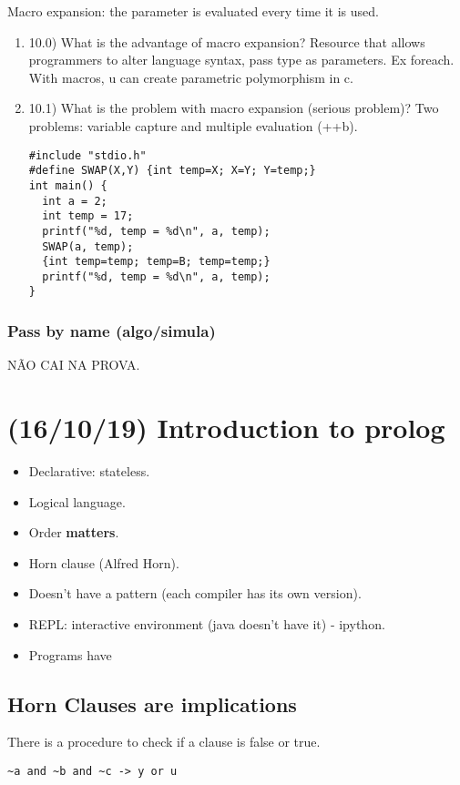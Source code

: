 \documentclass[11pt]{article}
\begin{document}
Macro expansion: the parameter is evaluated every time it is used.
\begin{enumerate}
\item 10.0) What is the advantage of macro expansion?
\label{sec:org4fd13bf}
Resource that allows programmers to alter language syntax, pass type as
parameters. Ex foreach. With macros, u can create parametric polymorphism in c.
\item 10.1) What is the problem with macro expansion (serious problem)?
\label{sec:org25318e4}
Two problems: variable capture and multiple evaluation (++b).
\begin{verbatim}
#include "stdio.h"
#define SWAP(X,Y) {int temp=X; X=Y; Y=temp;}
int main() {
  int a = 2;
  int temp = 17;
  printf("%d, temp = %d\n", a, temp);
  SWAP(a, temp);
  {int temp=temp; temp=B; temp=temp;}
  printf("%d, temp = %d\n", a, temp);
}
\end{verbatim}
\end{enumerate}
\subsubsection{Pass by name (algo/simula)}
\label{sec:org1502ecf}
NÃO CAI NA PROVA.
\section{(16/10/19) Introduction to prolog}
\label{sec:org3c3640b}
\begin{itemize}
\item Declarative: stateless.
\item Logical language.
\item Order \textbf{matters}.
\item Horn clause (Alfred Horn).
\item Doesn't have a pattern (each compiler has its own version).
\item REPL: interactive environment (java doesn't have it) - ipython.
\item Programs have
\end{itemize}
\subsection{Horn Clauses are implications}
\label{sec:orga24a965}
There is a procedure to check if a clause is false or true.

\begin{verbatim}
~a and ~b and ~c -> y or u
\end{verbatim}
\end{document}
